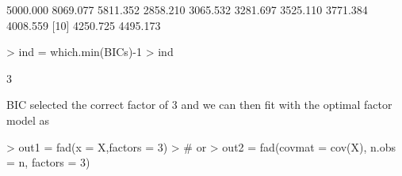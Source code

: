 \documentclass{article}
\begin{document}
\begin{Schunk}
\begin{Soutput}
 [1] 5000.000 8069.077 5811.352 2858.210 3065.532 3281.697 3525.110 3771.384 4008.559
[10] 4250.725 4495.173
\end{Soutput}
\begin{Sinput}
> ind = which.min(BICs)-1
> ind
\end{Sinput}
\begin{Soutput}
[1] 3
\end{Soutput}
\end{Schunk}

BIC selected the correct factor of 3 and we can then fit with the optimal factor model as
\begin{Schunk}
\begin{Sinput}
> out1 = fad(x = X,factors = 3)
> # or
> out2 = fad(covmat = cov(X), n.obs = n, factors = 3)
\end{Sinput}
\end{Schunk}
\end{document}
